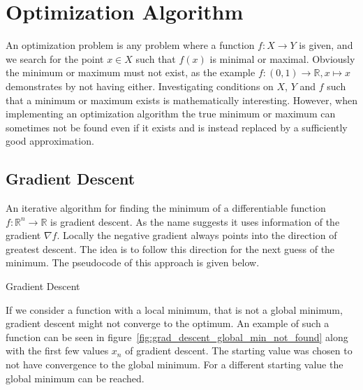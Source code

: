 \chapter{Optimization Algorithm}
\label{chapter:optimization}

An optimization problem is any problem where a function $f:X \rightarrow Y$ is given, and we search for the point $x \in X$ such that $f(x)$ is minimal or maximal. Obviously the minimum or maximum must not exist, as the example $f: (0, 1) \rightarrow \mathbb{R}, x \mapsto x$ demonstrates by not having either. Investigating conditions on $X$, $Y$ and $f$ such that a minimum or maximum exists is mathematically interesting. However, when implementing an optimization algorithm the true minimum or maximum can sometimes not be found even if it exists and is instead replaced by a sufficiently good approximation.

\section{Gradient Descent}

An iterative algorithm for finding the minimum of a differentiable function $f: \mathbb{R}^n \rightarrow \mathbb{R}$ is gradient descent. As the name suggests it uses information of the gradient $\nabla f$. Locally the negative gradient always points into the direction of greatest descent. The idea is to follow this direction for the next guess of the minimum. The pseudocode of this approach is given below.

\begin{algorithm}[H] \label{alg:gradient_descent}
	\SetAlgoLined
	\DontPrintSemicolon
	\LinesNumbered
	\caption{Gradient Descent}
	
	\BlankLine
\end{algorithm}
\vspace{1cm}

If we consider a function with a local minimum, that is not a global minimum, gradient descent might not converge to the optimum. An example of such a function can be seen in figure~\ref{fig:grad_descent_global_min_not_found} along with the first few values $x_n$ of gradient descent. The starting value was chosen to not have convergence to the global minimum. For a different starting value the global minimum can be reached.

